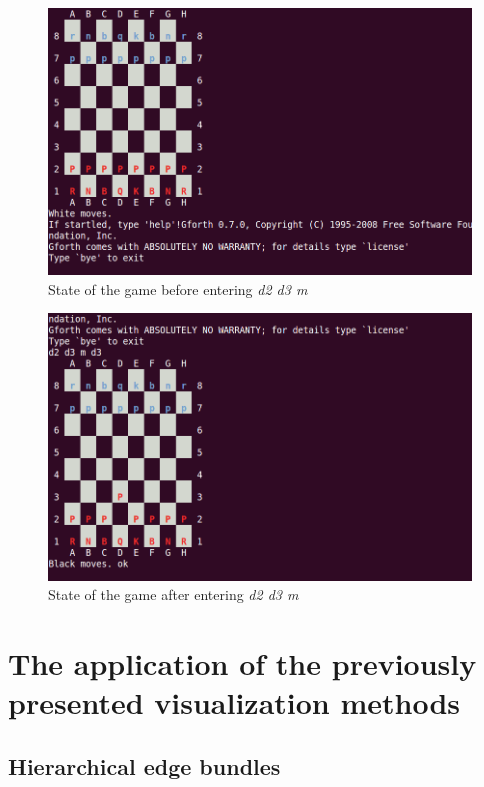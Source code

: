 \begin{figure}[p]
    \centering
    \includegraphics[scale=0.4]{graphics/brainless_before.png}
    \caption{State of the game before entering \emph{d2 d3 m}}
    \label{fig:brainless_before_m}
\end{figure}

\begin{figure}[p]
    \centering
    \includegraphics[scale=0.4]{graphics/brainless_after.png}
    \caption{State of the game after entering \emph{d2 d3 m}}
    \label{fig:brainless_after_m}
\end{figure}

\section{The application of the previously presented visualization methods}

\subsection*{Hierarchical edge bundles}

